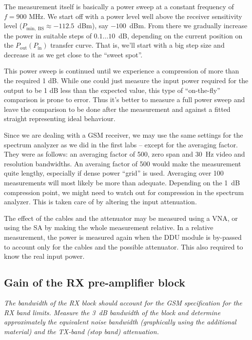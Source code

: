 \documentclass[a4paper, 12pt]{article}
\begin{document}
The measurement itself is basically a power sweep at a constant frequency of 
$f = 900$ MHz. We start off with a power level well above the receiver sensitivity 
level ($P_\mathrm{min,\;BS} \approx -112.5$~dBm), say $-100$~dBm. From there we 
gradually increase the power in suitable steps of $0.1 \ldots 10$~dB, depending on 
the current position on the $P_\mathrm{out}(P_\mathrm{in})$ transfer curve. That 
is, we'll start with a big step size and decrease it as we get close to the 
``sweet spot''. 

This power sweep is continued until we experience a compression of more than the 
required 1 dB. While one could just measure the input power required for the output 
to be 1 dB less than the expected value, this type of ``on-the-fly'' comparison 
is prone to error. Thus it's better to measure a full power sweep and leave the 
comparison to be done after the measurement and against a fitted straight representing 
ideal behaviour.

Since we are dealing with a GSM receiver, we may use the same settings for the 
spectrum analyzer as we did in the first labs -- except for the averaging factor. 
They were as follows: an averaging factor of 500, zero span and 30~Hz video and 
resolution bandwidths. An averaing factor of 500 would make the measurement quite 
lengthy, especially if dense power ``grid'' is used. Averaging over 100 measurements 
will most likely be more than adequate. Depending on the 1~dB compression point, 
we might need to watch out for compression in the spectrum analyzer. This is taken 
care of by altering the input attenuation.

The effect of the cables and the attenuator may be measured using a VNA, or using 
the SA by making the whole measurement relative. In a relative measurement, the power 
is measured again when the DDU module is by-passed to account only for the cables 
and the possible attenuator. This also required to know the real input power.


\subsection{Gain of the RX pre-amplifier block}

\textit{The bandwidth of the RX block should account for the GSM specification 
for the RX band limits. Measure the 3~dB bandwidth of the block and determine 
approximately the equivalent noise bandwidth (graphically using the additional 
material) and the TX-band (stop band) attenuation.}
\end{document}
